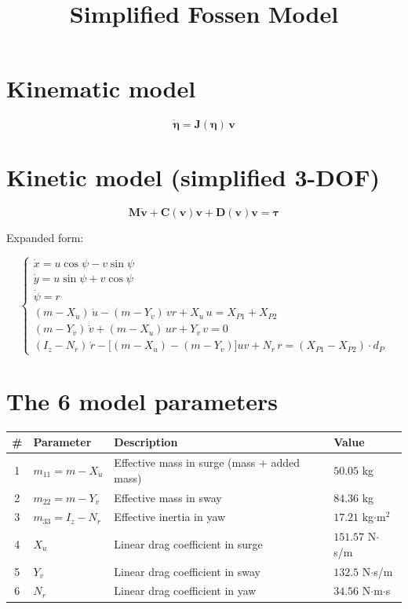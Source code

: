 \documentclass[11pt]{article}
\title{Simplified Fossen Model}
\author{}
\date{}
\begin{document}
\maketitle

\section*{Kinematic model}

\begin{equation}
\dot{\boldsymbol{\eta}} = \mathbf{J}(\boldsymbol{\eta})\,\mathbf{v}
\end{equation}

\section*{Kinetic model (simplified 3-DOF)}

\begin{equation}
\mathbf{M}\dot{\mathbf{v}} + \mathbf{C}(\mathbf{v})\mathbf{v} + \mathbf{D}(\mathbf{v})\mathbf{v} = \boldsymbol{\tau}
\end{equation}

Expanded form:

\begin{equation}
\begin{cases}
\dot{x} = u\cos\psi - v\sin\psi\\[4pt]
\dot{y} = u\sin\psi + v\cos\psi\\[4pt]
\dot{\psi} = r\\[4pt]
(m-X_{\dot{u}})\,\dot{u} - (m-Y_{\dot{v}})\,vr + X_u\,u = X_{P1}+X_{P2}\\[4pt]
(m-Y_{\dot{v}})\,\dot{v} + (m-X_{\dot{u}})\,ur + Y_v\,v = 0\\[4pt]
(I_z-N_{\dot{r}})\,\dot{r} - \big[(m-X_{\dot{u}})-(m-Y_{\dot{v}})\big]uv + N_r\,r = (X_{P1}-X_{P2})\cdot d_P
\end{cases}
\end{equation}

\section*{The 6 model parameters}

\begin{table}[h]
\centering
\begin{tabular}{clll}
\toprule
\# & Parameter & Description & Value \\
\midrule
1 & $m_{11}=m-X_{\dot{u}}$ & Effective mass in surge (mass + added mass) & $50.05$ kg \\
2 & $m_{22}=m-Y_{\dot{v}}$ & Effective mass in sway & $84.36$ kg \\
3 & $m_{33}=I_z-N_{\dot{r}}$ & Effective inertia in yaw & $17.21$ kg$\cdot$m$^2$ \\
4 & $X_u$ & Linear drag coefficient in surge & $151.57$ N$\cdot$s/m \\
5 & $Y_v$ & Linear drag coefficient in sway & $132.5$ N$\cdot$s/m \\
6 & $N_r$ & Linear drag coefficient in yaw & $34.56$ N$\cdot$m$\cdot$s \\
\bottomrule
\end{tabular}
\end{table}
\end{document}

